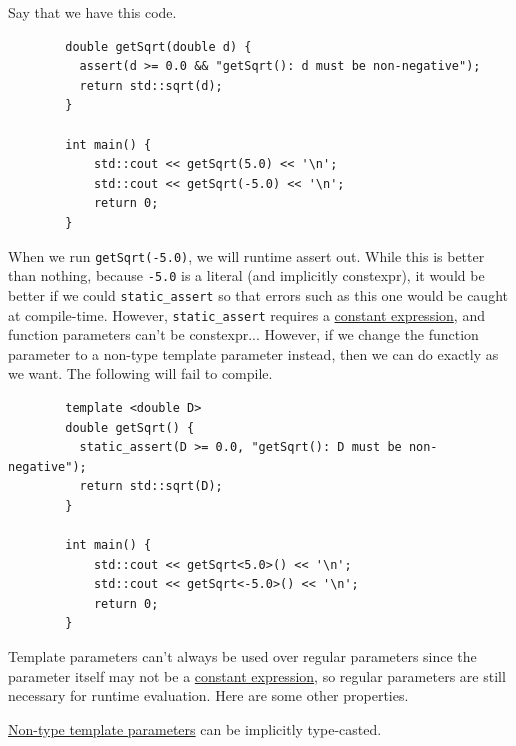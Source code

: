 \documentclass{article}
\newcounter{example}[section]
\newcounter{code}[section]
\begin{document}
    \begin{example}[Motivation]
      \label{ex:motivation}
      Say that we have this code. 

      \begin{lstlisting}
        double getSqrt(double d) {
          assert(d >= 0.0 && "getSqrt(): d must be non-negative");
          return std::sqrt(d);
        }

        int main() {
            std::cout << getSqrt(5.0) << '\n';
            std::cout << getSqrt(-5.0) << '\n';
            return 0;
        } 
      \end{lstlisting}

      When we run \texttt{getSqrt(-5.0)}, we will runtime assert out. While this is better than nothing, because \texttt{-5.0} is a literal (and implicitly constexpr), it would be better if we could \texttt{static\_assert} so that errors such as this one would be caught at compile-time. However, \texttt{static\_assert} requires a \hyperref[def:constant-expression]{constant expression}, and function parameters can’t be constexpr... However, if we change the function parameter to a non-type template parameter instead, then we can do exactly as we want. The following will fail to compile. 
      \begin{lstlisting}
        template <double D> 
        double getSqrt() {
          static_assert(D >= 0.0, "getSqrt(): D must be non-negative");
          return std::sqrt(D);
        }

        int main() {
            std::cout << getSqrt<5.0>() << '\n';
            std::cout << getSqrt<-5.0>() << '\n';
            return 0;
        } 
      \end{lstlisting}
    \end{example}

    Template parameters can't always be used over regular parameters since the parameter itself may not be a \hyperref[def:constant-expression]{constant expression}, so regular parameters are still necessary for runtime evaluation. Here are some other properties. 

    \begin{lemma}
      \label{thm:implicit-casts-of-non-type-template-parameters}
 
      \hyperref[def:non-type-template-parameters]{Non-type template parameters} can be implicitly type-casted. 
    \end{lemma}
\end{document}
